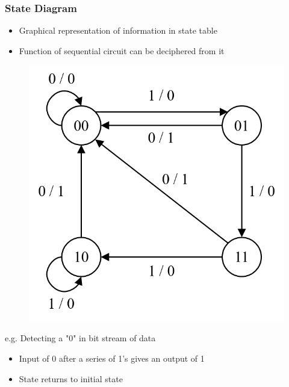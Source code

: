 \documentclass[a4paper]{article}
\begin{document}
\subsubsection{State Diagram}
\begin{itemize}
    \item Graphical representation of information in state table
    \item Function of sequential circuit can be deciphered from it
\end{itemize}
\begin{minipage}{0.35\textwidth}
\begin{figure}[H]
    \centering
    \includegraphics[width=\textwidth]{state-diagram.png}
\end{figure}
\end{minipage}
\begin{minipage}{0.5\textwidth}
\begin{center}
    e.g. Detecting a "0" in bit stream of data
\begin{itemize}
    \item Input of 0 after a series of 1's gives an output of 1
    \item State returns to initial state
\end{itemize}
\end{center}
\end{minipage}
\end{document}
